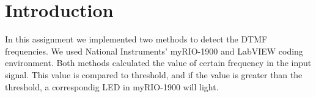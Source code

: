 \section{Introduction}
In this assignment we implemented two methods to detect the DTMF frequencies. We used National Instruments’ myRIO-1900 and LabVIEW coding environment. Both methods calculated the value of certain frequency in the input signal. This value is compared to threshold, and if the value is greater than the threshold, a correspondig LED in myRIO-1900 will light.